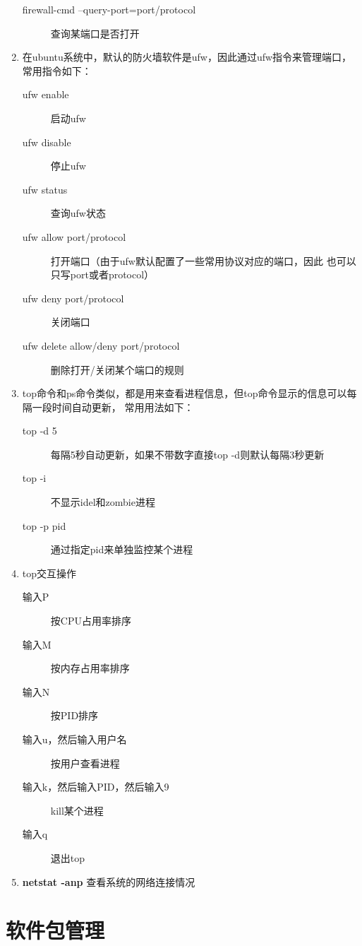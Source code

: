 \documentclass[11pt]{article}
\begin{document}
\begin{enumerate}
\begin{description}
    \item[firewall-cmd --query-port=port/protocol] 查询某端口是否打开
\end{description}
\item 在ubuntu系统中，默认的防火墙软件是ufw，因此通过ufw指令来管理端口，常用指令如下：
\begin{description}
    \item[ufw enable] 启动ufw
    \item[ufw disable] 停止ufw
    \item[ufw status] 查询ufw状态
    \item[ufw allow port/protocol] 打开端口（由于ufw默认配置了一些常用协议对应的端口，因此
    也可以只写port或者protocol）
    \item [ufw deny port/protocol] 关闭端口
    \item [ufw delete allow/deny port/protocol] 删除打开/关闭某个端口的规则
\end{description}
\item top命令和ps命令类似，都是用来查看进程信息，但top命令显示的信息可以每隔一段时间自动更新，
常用用法如下：
\begin{description}
    \item[top -d 5] 每隔5秒自动更新，如果不带数字直接top -d则默认每隔3秒更新
    \item[top -i] 不显示idel和zombie进程
    \item[top -p pid] 通过指定pid来单独监控某个进程
\end{description}
\item top交互操作
\begin{description}
    \item[输入P] 按CPU占用率排序
    \item[输入M] 按内存占用率排序
    \item[输入N] 按PID排序
    \item[输入u，然后输入用户名] 按用户查看进程
    \item[输入k，然后输入PID，然后输入9] kill某个进程
    \item[输入q] 退出top
\end{description}
\item \textbf{netstat -anp} 查看系统的网络连接情况
\end{enumerate}

\section{软件包管理}

















    
\end{document}
